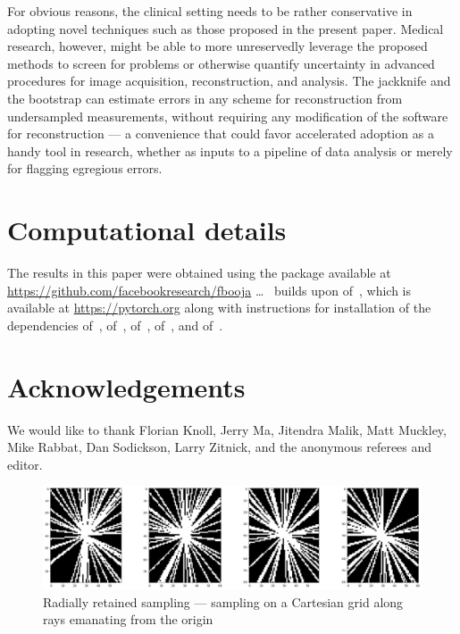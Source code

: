 \documentclass[article]{jdssv}
\begin{document}
For obvious reasons, the clinical setting needs to be rather conservative
in adopting novel techniques such as those proposed in the present paper.
Medical research, however, might be able to more unreservedly leverage
the proposed methods to screen for problems or otherwise quantify uncertainty
in advanced procedures for image acquisition, reconstruction, and analysis.
The jackknife and the bootstrap can estimate errors in any scheme
for reconstruction from undersampled measurements, without requiring
any modification of the software for reconstruction --- a convenience
that could favor accelerated adoption as a handy tool in research,
whether as inputs to a pipeline of data analysis
or merely for flagging egregious errors.




\section*{Computational details}

The results in this paper were obtained using the  package
 available at \url{https://github.com/facebookresearch/fbooja}
\dots\  builds upon  of~\citet{pytorch},
which is available at \url{https://pytorch.org} along with instructions
for installation of the dependencies  of~\citet{matplotlib},
 of~\citet{numpy},  of~\cite{pillow},
 of~\citet{scikit-image}, and  of~\citet{scipy}.




\section*{Acknowledgements}

We would like to thank Florian Knoll, Jerry Ma, Jitendra Malik, Matt Muckley,
Mike Rabbat, Dan Sodickson, Larry Zitnick, and the anonymous referees
and editor.




\begin{figure}
\parbox{\textwidth}{\includegraphics[width=\textwidth]{mask}}
\caption{Radially retained sampling ---
         sampling on a Cartesian grid along rays emanating from the origin}
\label{radialines}
\end{figure}
\end{document}
